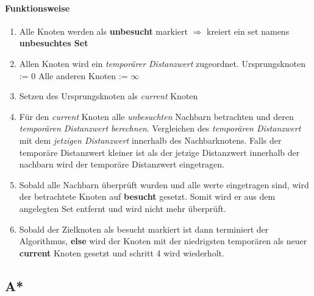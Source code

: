 \paragraph{Funktionsweise}
\begin{enumerate}
	\item Alle Knoten werden als \textbf{unbesucht} markiert $\Rightarrow$ kreiert ein set namens \textbf{unbesuchtes Set}
	\item Allen Knoten wird ein \textit{temporärer Distanzwert} zugeordnet.
	\subitem Ursprungsknoten := 0
	\subitem Alle anderen Knoten := $\infty$
	\item Setzen des Ursprungsknoten als \textit{current} Knoten
	\item Für den \textit{current} Knoten alle \textit{unbesuchten} Nachbarn betrachten und deren \textit{temporären Distanzwert berechnen}.
	Vergleichen des \textit{temporären Distanzwert} mit dem \textit{jetzigen Distanzwert} innerhalb des Nachbarknotens.
	Falls der temporäre Distanzwert kleiner ist als der jetzige Distanzwert innerhalb der nachbarn wird der temporäre Distanzwert eingetragen.
	\item Sobald alle Nachbarn überprüft wurden und alle werte eingetragen sind, wird der betrachtete Knoten auf \textbf{besucht} gesetzt. Somit wird er aus dem angelegten Set entfernt und wird nicht mehr überprüft.
	\item Sobald der Zielknoten als besucht markiert ist dann terminiert der Algorithmus, \textbf{else} wird der Knoten mit der niedrigsten temporären als neuer \textbf{current} Knoten gesetzt und schritt 4 wird wiederholt.
\end{enumerate}

\subsection{A*}
